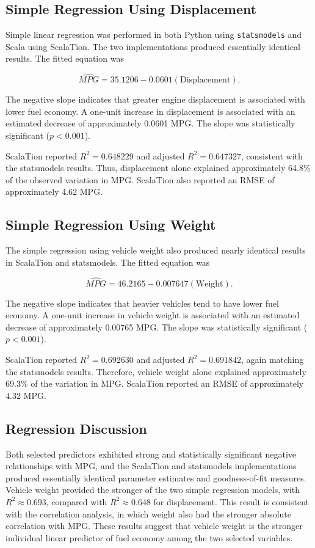 \subsection{Simple Regression Using Displacement}

Simple linear regression was performed in both Python using
\texttt{statsmodels} and Scala using ScalaTion. The two implementations
produced essentially identical results. The fitted equation was

\[
\widehat{MPG}
=
35.1206 - 0.0601(\mathrm{Displacement}).
\]

The negative slope indicates that greater engine displacement is associated
with lower fuel economy. A one-unit increase in displacement is associated
with an estimated decrease of approximately 0.0601 MPG. The slope was
statistically significant ($p<0.001$).

ScalaTion reported $R^2=0.648229$ and adjusted $R^2=0.647327$, consistent
with the statsmodels results. Thus, displacement alone explained approximately
64.8\% of the observed variation in MPG. ScalaTion also reported an RMSE of
approximately 4.62 MPG.

\subsection{Simple Regression Using Weight}

The simple regression using vehicle weight also produced nearly identical
results in ScalaTion and statsmodels. The fitted equation was

\[
\widehat{MPG}
=
46.2165 - 0.007647(\mathrm{Weight}).
\]

The negative slope indicates that heavier vehicles tend to have lower fuel
economy. A one-unit increase in vehicle weight is associated with an estimated
decrease of approximately 0.00765 MPG. The slope was statistically significant
($p<0.001$).

ScalaTion reported $R^2=0.692630$ and adjusted $R^2=0.691842$, again matching
the statsmodels results. Therefore, vehicle weight alone explained
approximately 69.3\% of the variation in MPG. ScalaTion reported an RMSE of
approximately 4.32 MPG.

\subsection{Regression Discussion}

Both selected predictors exhibited strong and statistically significant
negative relationships with MPG, and the ScalaTion and statsmodels
implementations produced essentially identical parameter estimates and
goodness-of-fit measures. Vehicle weight provided the stronger of the two
simple regression models, with $R^2 \approx 0.693$, compared with
$R^2 \approx 0.648$ for displacement. This result is consistent with the
correlation analysis, in which weight also had the stronger absolute
correlation with MPG. These results suggest that vehicle weight is the
stronger individual linear predictor of fuel economy among the two selected
variables.